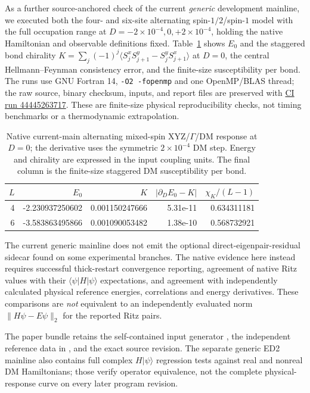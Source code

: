 \documentclass[preprint,12pt,nopreprintline]{elsarticle}
\begin{document}
As a further source-anchored check of the current
\emph{generic} development mainline, we executed both the
four- and six-site alternating spin-$1/2$/spin-$1$
model with the full occupation range at
$D=-2\times10^{-4},0,+2\times10^{-4}$,
holding the native Hamiltonian and observable definitions
fixed. Table~\ref{tab:mainline-current-native-dm}
shows $E_0$ and the staggered bond chirality
$K=\sum_j(-1)^j\langle S_j^xS_{j+1}^y-
S_j^yS_{j+1}^x\rangle$ at $D=0$, the central
Hellmann--Feynman consistency error, and the finite-size
susceptibility per bond. The runs use GNU Fortran 14,
\texttt{-O2 -fopenmp} and one OpenMP/BLAS thread;
the raw source, binary checksum, inputs, and report files
are preserved with
\href{https://github.com/ueda1984/ED2/actions/runs/44445263717}{CI run 44445263717}.
These are finite-size physical reproducibility checks,
not timing benchmarks or a thermodynamic extrapolation.

\begin{table}[t]
\centering
\caption{Native current-main alternating mixed-spin XYZ/$\Gamma$/DM
response at $D=0$; the derivative uses the symmetric
$2\times10^{-4}$ DM step. Energy and chirality
are expressed in the input coupling units. The final
column is the finite-size staggered DM susceptibility per bond.}
\label{tab:mainline-current-native-dm}
\small
\begin{tabular}{rrrrr}
\toprule
$L$ & $E_0$ & $K$ & $|\partial_D E_0-K|$ & $\chi_K/(L-1)$ \\
\midrule
4 & -2.230937250602 & 0.001150247666 & 5.31e-11 & 0.634311181 \\
6 & -3.583863495866 & 0.001090053482 & 1.38e-10 & 0.568732921 \\
\bottomrule
\end{tabular}
\end{table}

The current generic mainline does not emit the optional
direct-eigenpair-residual sidecar found on some experimental
branches. The native evidence here instead requires
successful thick-restart convergence reporting,
agreement of native Ritz values with their
$\langle\psi|H|\psi\rangle$ expectations, and
agreement with independently calculated physical reference
energies, correlations and energy derivatives. These
comparisons are \emph{not} equivalent to an independently
evaluated norm $\|H\psi-E\psi\|_2$ for the reported Ritz pairs.

The paper bundle retains the self-contained input generator
, the
independent reference data in
, and
the exact source revision. The separate generic ED2 mainline
also contains full complex $H|\psi\rangle$ regression tests
against real and nonreal DM Hamiltonians; those verify
operator equivalence, not the complete physical-response
curve on every later program revision.
\end{document}
